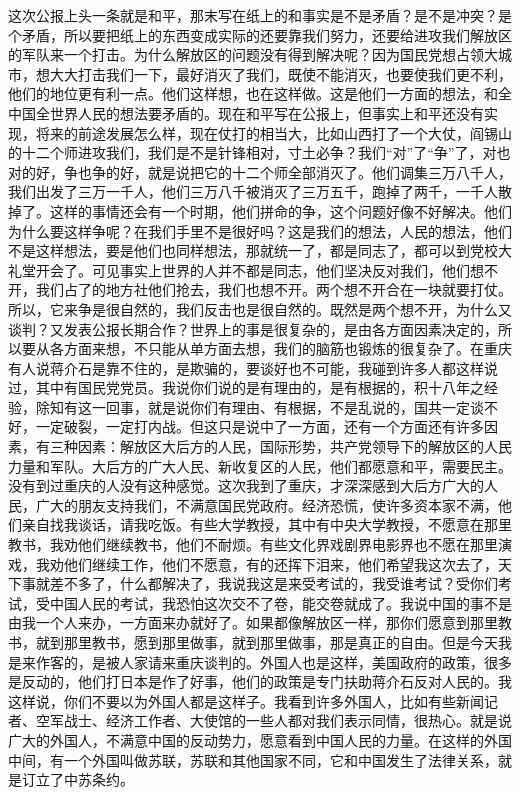 这次公报上头一条就是和平，那末写在纸上的和事实是不是矛盾？是不是冲突？是个矛盾，所以要把纸上的东西变成实际的还要靠我们努力，还要给进攻我们解放区的军队来一个打击。为什么解放区的问题没有得到解决呢？因为国民党想占领大城市，想大大打击我们一下，最好消灭了我们，既使不能消灭，也要使我们更不利，他们的地位更有利一点。他们这样想，也在这样做。这是他们一方面的想法，和全中国全世界人民的想法要矛盾的。现在和平写在公报上，但事实上和平还没有实现，将来的前途发展怎么样，现在仗打的相当大，比如山西打了一个大仗，阎锡山的十二个师进攻我们，我们是不是针锋相对，寸土必争？我们“对”了“争”了，对也对的好，争也争的好，就是说把它的十二个师全部消灭了。他们调集三万八千人，我们出发了三万一千人，他们三万八千被消灭了三万五千，跑掉了两千，一千人散掉了。这样的事情还会有一个时期，他们拼命的争，这个问题好像不好解决。他们为什么要这样争呢？在我们手里不是很好吗？这是我们的想法，人民的想法，他们不是这样想法，要是他们也同样想法，那就统一了，都是同志了，都可以到党校大礼堂开会了。可见事实上世界的人并不都是同志，他们坚决反对我们，他们想不开，我们占了的地方社他们抢去，我们也想不开。两个想不开合在一块就要打仗。所以，它来争是很自然的，我们反击也是很自然的。既然是两个想不开，为什么又谈判？又发表公报长期合作？世界上的事是很复杂的，是由各方面因素决定的，所以要从各方面来想，不只能从单方面去想，我们的脑筋也锻炼的很复杂了。在重庆有人说蒋介石是靠不住的，是欺骗的，要谈好也不可能，我碰到许多人都这样说过，其中有国民党党员。我说你们说的是有理由的，是有根据的，积十八年之经验，除知有这一回事，就是说你们有理由、有根据，不是乱说的，国共一定谈不好，一定破裂，一定打内战。但这只是说中了一方面，还有一个方面还有许多因素，有三种因素：解放区大后方的人民，国际形势，共产党领导下的解放区的人民力量和军队。大后方的广大人民、新收复区的人民，他们都愿意和平，需要民主。没有到过重庆的人没有这种感觉。这次我到了重庆，才深深感到大后方广大的人民，广大的朋友支持我们，不满意国民党政府。经济恐慌，使许多资本家不满，他们亲自找我谈话，请我吃饭。有些大学教授，其中有中央大学教授，不愿意在那里教书，我劝他们继续教书，他们不耐烦。有些文化界戏剧界电影界也不愿在那里演戏，我劝他们继续工作，他们不愿意，有的还挥下泪来，他们希望我这次去了，天下事就差不多了，什么都解决了，我说我这是来受考试的，我受谁考试？受你们考试，受中国人民的考试，我恐怕这次交不了卷，能交卷就成了。我说中国的事不是由我一个人来办，一方面来办就好了。如果都像解放区一样，那你们愿意到那里教书，就到那里教书，愿到那里做事，就到那里做事，那是真正的自由。但是今天我是来作客的，是被人家请来重庆谈判的。外国人也是这样，美国政府的政策，很多是反动的，他们打日本是作了好事，他们的政策是专门扶助蒋介石反对人民的。我这样说，你们不要以为外国人都是这样子。我看到许多外国人，比如有些新闻记者、空军战士、经济工作者、大使馆的一些人都对我们表示同情，很热心。就是说广大的外国人，不满意中国的反动势力，愿意看到中国人民的力量。在这样的外国中间，有一个外国叫做苏联，苏联和其他国家不同，它和中国发生了法律关系，就是订立了中苏条约。


